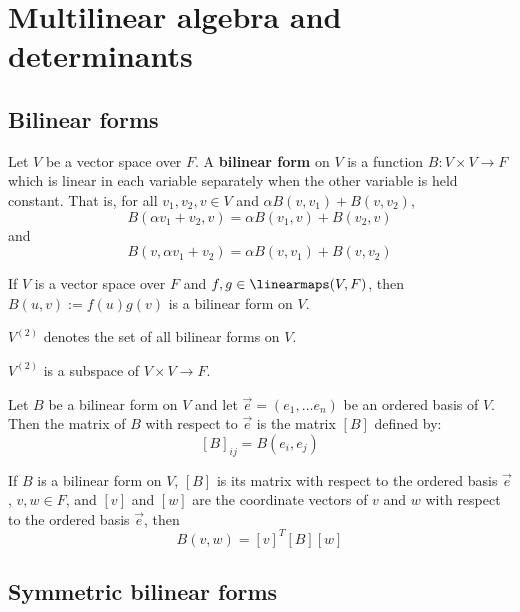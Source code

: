 \section{Multilinear algebra and determinants}

\subsection{Bilinear forms}

\begin{definition}
  Let $V$ be a vector space over $F$. A \textbf{bilinear form} on $V$ is a function $B : V \times V \to F$ which is linear in each variable separately when the other variable is held constant. That is, for all $v_1, v_2, v \in V$ and $\alpha B(v, v_1) + B(v, v_2)$, 
  \[
    B(\alpha v_1 + v_2, v) = \alpha B(v_1, v) + B(v_2, v)
  \]
  and
  \[
    B(v, \alpha v_1 + v_2) = \alpha B(v, v_1) + B(v, v_2)
  \]
\end{definition}

\begin{lemma}
  If $V$ is a vector space over $F$ and $f, g \in \linearmaps(V, F)$, then $B(u, v) := f(u) g(v)$ is a bilinear form on $V$.
\end{lemma}

\begin{definition}
  $V^{(2)}$ denotes the set of all bilinear forms on $V$.
\end{definition}

\begin{lemma}
  $V^{(2)}$ is a subspace of $V \times V \to F$.
\end{lemma}

\begin{definition}
  Let $B$ be a bilinear form on $V$ and let $\vec{e} = (e_1, \ldots e_n)$ be an ordered basis of $V$. Then the matrix of $B$ with respect to $\vec{e}$ is the matrix $[B]$ defined by:
  \[
    [B]_{ij} = B(e_i, e_j)
  \]
\end{definition}

\begin{theorem}
  If $B$ is a bilinear form on $V$, $[B]$ is its matrix with respect to the ordered basis $\vec{e}$, $v, w \in F$, and $[v]$ and $[w]$ are the coordinate vectors of $v$ and $w$ with respect to the ordered basis $\vec{e}$, then
  \[
    B(v, w) = [v]^T [B] [w]
  \]
\end{theorem}

\subsection{Symmetric bilinear forms}

